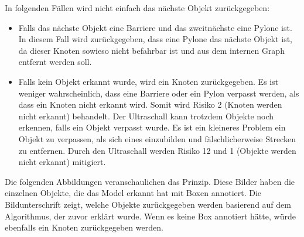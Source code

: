 In folgenden Fällen wird nicht einfach das nächste Objekt zurückgegeben:

\begin{itemize}
    \item Falls das nächste Objekt eine Barriere und das zweitnächste eine Pylone ist. In diesem Fall wird zurückgegeben, dass eine Pylone das nächste Objekt ist, da dieser Knoten sowieso nicht befahrbar ist und aus dem internen Graph entfernt werden soll.
    \item Falls kein Objekt erkannt wurde, wird ein Knoten zurückgegeben. Es ist weniger wahrscheinlich, dass eine Barriere oder ein Pylon verpasst werden, als dass ein Knoten nicht erkannt wird. Somit wird Risiko 2 (Knoten werden nicht erkannt) behandelt. Der Ultraschall kann trotzdem Objekte noch erkennen, falls ein Objekt verpasst wurde. Es ist ein kleineres Problem ein Objekt zu verpassen, als sich eines einzubilden und fälschlicherweise Strecken zu entfernen. Durch den Ultraschall werden Risiko 12 und 1 (Objekte werden nicht erkannt) mitigiert.
\end{itemize}

Die folgenden Abbildungen veranschaulichen das Prinzip. Diese Bilder haben die einzelnen Objekte, die das Model erkannt hat mit Boxen annotiert. Die Bildunterschrift zeigt, welche Objekte zurückgegeben werden basierend auf dem Algorithmus, der zuvor erklärt wurde. Wenn es keine Box annotiert hätte, würde ebenfalls ein Knoten zurückgegeben werden.

